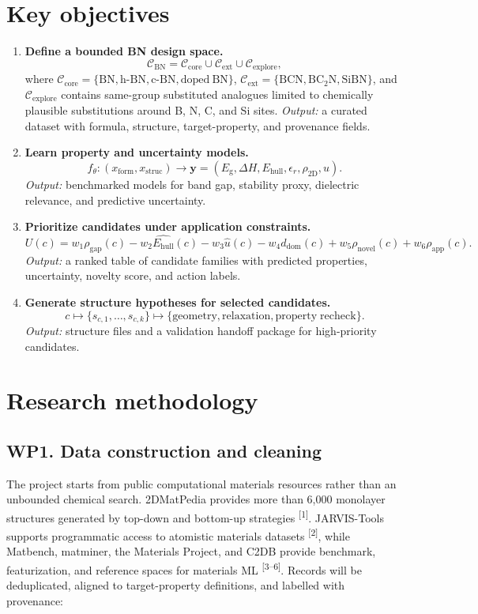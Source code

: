 \documentclass[10pt]{article}
\newcommand{\eg}{E_{\mathrm{g}}}
\newcommand{\ehull}{E_{\mathrm{hull}}}
\newcommand{\form}{x_{\mathrm{form}}}
\newcommand{\struc}{x_{\mathrm{struc}}}
\newcommand{\unc}{u}
\newcommand{\domain}{d_{\mathrm{dom}}}
\newcommand{\utility}{U}
\newcommand{\gapscore}{\rho_{\mathrm{gap}}}
\begin{document}
\section*{Key objectives}
\begin{enumerate}
  \item \textbf{Define a bounded BN design space.}
  \[
    \mathcal{C}_{\mathrm{BN}}=
    \mathcal{C}_{\mathrm{core}}\cup\mathcal{C}_{\mathrm{ext}}\cup
    \mathcal{C}_{\mathrm{explore}},
  \]
  where $\mathcal{C}_{\mathrm{core}}=\{\mathrm{BN},\mathrm{h\mbox{-}BN},
  \mathrm{c\mbox{-}BN},\mathrm{doped\ BN}\}$,
  $\mathcal{C}_{\mathrm{ext}}=\{\mathrm{BCN},\mathrm{BC_2N},\mathrm{SiBN}\}$,
  and $\mathcal{C}_{\mathrm{explore}}$ contains same-group substituted analogues
  limited to chemically plausible substitutions around B, N, C, and Si sites.
  \textit{Output:} a curated dataset with formula, structure, target-property,
  and provenance fields.

  \item \textbf{Learn property and uncertainty models.}
  \[
    f_{\theta}:(\form,\struc)\rightarrow
    \mathbf{y}=(\eg,\Delta H,\ehull,\epsilon_r,\rho_{\mathrm{2D}},\unc).
  \]
  \textit{Output:} benchmarked models for band gap, stability proxy, dielectric
  relevance, and predictive uncertainty.

  \item \textbf{Prioritize candidates under application constraints.}
  \[
    \utility(c)=w_1\gapscore(c)-w_2\hat{\ehull}(c)-w_3\hat{\unc}(c)
    -w_4\domain(c)+w_5\rho_{\mathrm{novel}}(c)+w_6\rho_{\mathrm{app}}(c).
  \]
  \textit{Output:} a ranked table of candidate families with predicted
  properties, uncertainty, novelty score, and action labels.

  \item \textbf{Generate structure hypotheses for selected candidates.}
  \[
    c \mapsto \{s_{c,1},\ldots,s_{c,k}\}
    \mapsto \{\mathrm{geometry},\mathrm{relaxation},\mathrm{property\;recheck}\}.
  \]
  \textit{Output:} structure files and a validation handoff package for
  high-priority candidates.
\end{enumerate}

\section*{Research methodology}
\subsection*{WP1. Data construction and cleaning}
The project starts from public computational materials resources rather than an unbounded chemical search. 2DMatPedia provides more than 6,000 monolayer structures generated by top-down and bottom-up strategies \textsuperscript{[1]}. JARVIS-Tools supports programmatic access to atomistic materials datasets \textsuperscript{[2]}, while Matbench, matminer, the Materials Project, and C2DB provide benchmark, featurization, and reference spaces for materials ML \textsuperscript{[3--6]}. Records will be deduplicated, aligned to target-property definitions, and labelled with provenance:
\end{document}
